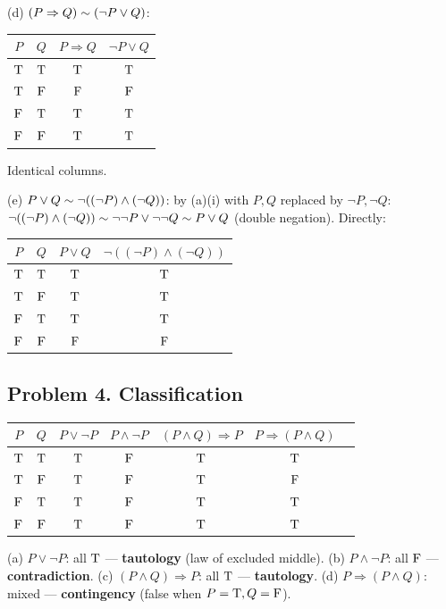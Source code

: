 (d) $(P\Rightarrow Q)\sim(\neg P\vee Q)$:
\begin{center}
	\begin{tabular}{cc|c|c}
		\toprule
		$P$&$Q$&$P\Rightarrow Q$&$\neg P\vee Q$\\
		\midrule
		$\mathrm{T}$&$\mathrm{T}$&$\mathrm{T}$&$\mathrm{T}$\\
		$\mathrm{T}$&$\mathrm{F}$&$\mathrm{F}$&$\mathrm{F}$\\
		$\mathrm{F}$&$\mathrm{T}$&$\mathrm{T}$&$\mathrm{T}$\\
		$\mathrm{F}$&$\mathrm{F}$&$\mathrm{T}$&$\mathrm{T}$\\
		\bottomrule
	\end{tabular}
\end{center}
Identical columns.

(e) $P\vee Q\sim\neg((\neg P)\wedge(\neg Q))$: by (a)(i) with $P,Q$ replaced by $\neg P,\neg Q$: $\neg((\neg P)\wedge(\neg Q))\sim\neg\neg P\vee\neg\neg Q\sim P\vee Q$ (double negation). Directly:
\begin{center}
	\begin{tabular}{cc|c|c}
		\toprule
		$P$&$Q$&$P\vee Q$&$\neg((\neg P)\wedge(\neg Q))$\\
		\midrule
		$\mathrm{T}$&$\mathrm{T}$&$\mathrm{T}$&$\mathrm{T}$\\
		$\mathrm{T}$&$\mathrm{F}$&$\mathrm{T}$&$\mathrm{T}$\\
		$\mathrm{F}$&$\mathrm{T}$&$\mathrm{T}$&$\mathrm{T}$\\
		$\mathrm{F}$&$\mathrm{F}$&$\mathrm{F}$&$\mathrm{F}$\\
		\bottomrule
	\end{tabular}
\end{center}

\subsection*{Problem 4. Classification}
\begin{center}
	\begin{tabular}{cc|c|c|c|c|c}
		\toprule
		$P$&$Q$&$P\vee\neg P$&$P\wedge\neg P$&$(P\wedge Q)\Rightarrow P$&$P\Rightarrow(P\wedge Q)$\\
		\midrule
		$\mathrm{T}$&$\mathrm{T}$&$\mathrm{T}$&$\mathrm{F}$&$\mathrm{T}$&$\mathrm{T}$\\
		$\mathrm{T}$&$\mathrm{F}$&$\mathrm{T}$&$\mathrm{F}$&$\mathrm{T}$&$\mathrm{F}$\\
		$\mathrm{F}$&$\mathrm{T}$&$\mathrm{T}$&$\mathrm{F}$&$\mathrm{T}$&$\mathrm{T}$\\
		$\mathrm{F}$&$\mathrm{F}$&$\mathrm{T}$&$\mathrm{F}$&$\mathrm{T}$&$\mathrm{T}$\\
		\bottomrule
	\end{tabular}
\end{center}
(a) $P\vee\neg P$: all $\mathrm{T}$ — \textbf{tautology} (law of excluded middle). (b) $P\wedge\neg P$: all $\mathrm{F}$ — \textbf{contradiction}. (c) $(P\wedge Q)\Rightarrow P$: all $\mathrm{T}$ — \textbf{tautology}. (d) $P\Rightarrow(P\wedge Q)$: mixed — \textbf{contingency} (false when $P=\mathrm{T},Q=\mathrm{F}$).

